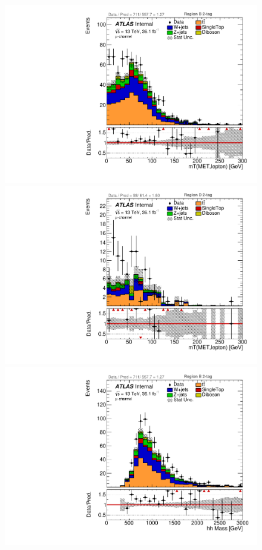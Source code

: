 \begin{figure}[!htbp]
\begin{center}
\includegraphics[scale=0.33]{./figures/boosted/ABCD_ScaledPrompt/muon_Inc_RegionB_WlepMtATLAS}
\includegraphics[scale=0.33]{./figures/boosted/ABCD_ScaledPrompt/muon_Inc_RegionD_WlepMtATLAS}\\
\includegraphics[scale=0.33]{./figures/boosted/ABCD_ScaledPrompt/muon_Inc_RegionB_hhMass}     

\end{center}
\end{figure}
